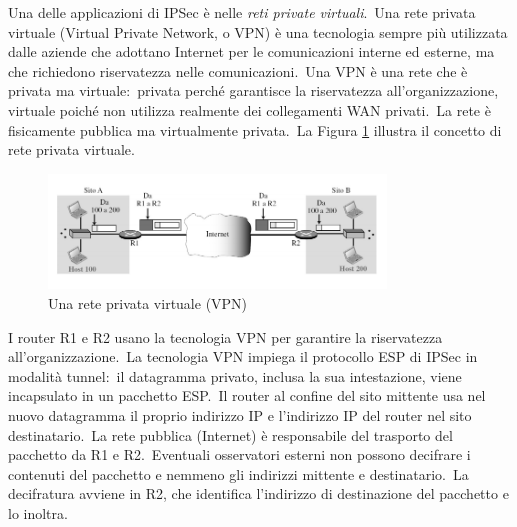 Una delle applicazioni di IPSec è nelle \textit{reti private virtuali}.\
Una rete privata virtuale (Virtual Private Network, o VPN) è una tecnologia sempre più utilizzata dalle aziende che adottano Internet per le comunicazioni interne ed esterne, ma che richiedono riservatezza nelle comunicazioni.\
Una VPN è una rete che è privata ma virtuale:\ privata perché garantisce la riservatezza all'organizzazione, virtuale poiché non utilizza realmente dei collegamenti WAN privati.\
La rete è fisicamente pubblica ma virtualmente privata.\
La Figura \ref{fig:VPN} illustra il concetto di rete privata virtuale.

\begin{figure}[H]
    \centering
    \includegraphics[width=0.8\textwidth]{immagini/VPN.png}
    \caption{Una rete privata virtuale (VPN)}
    \label{fig:VPN}
\end{figure}
I router R1 e R2 usano la tecnologia VPN per garantire la riservatezza all'organizzazione.\
La tecnologia VPN impiega il protocollo ESP di IPSec in modalità tunnel:\ il datagramma privato, inclusa la sua intestazione, viene incapsulato in un pacchetto ESP.\
Il router al confine del sito mittente usa nel nuovo datagramma il proprio indirizzo IP e l'indirizzo IP del router nel sito destinatario.\
La rete pubblica (Internet) è responsabile del trasporto del pacchetto da R1 e R2.\
Eventuali osservatori esterni non possono decifrare i contenuti del pacchetto e nemmeno gli indirizzi mittente e destinatario.\
La decifratura avviene in R2, che identifica l'indirizzo di destinazione del pacchetto e lo inoltra.
